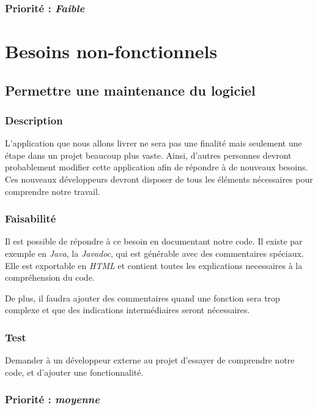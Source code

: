 \subsubsection{Priorité : \textit{Faible}}

\section{Besoins non-fonctionnels}\label{besoins_non-fonctionnels}

\subsection{Permettre une maintenance du logiciel}

\subsubsection{Description}

L’application que nous allons livrer ne sera pas une finalité mais seulement une étape dans un projet beaucoup plus vaste. Ainsi, d’autres personnes devront probablement modifier cette application afin de répondre à de nouveaux besoins. Ces nouveaux développeurs devront disposer de tous les éléments nécessaires pour comprendre notre travail. 

\subsubsection{Faisabilité}

Il est possible de répondre à ce besoin en documentant notre code. Il existe par exemple en \textit{Java}, la \textit{Javadoc}, qui est générable avec des commentaires spéciaux. Elle est exportable en \textit{HTML} et contient toutes les explications necessaires à la compréhension du code. 

De plus, il faudra ajouter des commentaires quand une fonction sera trop complexe et que des indications intermédiaires seront nécessaires.

\subsubsection{Test}

Demander à un développeur externe au projet d’essayer de comprendre notre code, et d'ajouter une fonctionnalité.

\subsubsection{Priorité : \textit{moyenne}}

